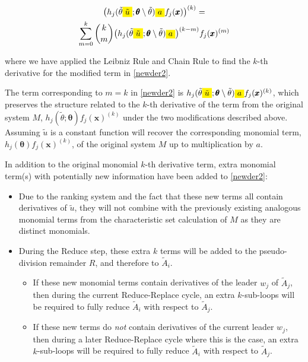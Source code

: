 \documentclass[a4paper,fleqn]{cas-dc}
\newcommand{\mathcolorbox}[2]{\colorbox{#1}{$\displaystyle #2$}}
\theoremstyle{definition}
\begin{document}
\begin{pf}
\begin{fleqn}
    \begin{multline}
        \big(h_j(\tilde{\theta} \mathcolorbox{Yellow}{\tilde{u}}; \pmb{\theta}\setminus \tilde{\theta}) \mathcolorbox{Yellow}{a} f_j(\pmb{x})\big)^{(k)} 
        = \\ \sum_{m=0}^{k} {\binom{k}{m}} \big(h_j(\tilde{\theta} \mathcolorbox{Yellow}{\tilde{u}}; \pmb{\theta}\setminus \tilde{\theta}) \mathcolorbox{Yellow}{a} \big)^{(k-m)}f_j(\pmb{x})^{(m)}  
        \label{newder2}  
    \end{multline}
    \end{fleqn}
    where we have applied the Leibniz Rule and Chain Rule to find the $k$-th derivative for the modified term in \cref{newder2}. 

    The term corresponding to $m=k$ in \cref{newder2} is $h_j(\tilde{\theta} \mathcolorbox{Yellow}{\tilde{u}}; \pmb{\theta}\setminus \tilde{\theta}) \mathcolorbox{Yellow}{a} f_j(\pmb{x})^{(k)}$, which preserves the structure related to the $k$-th derivative of the term from the original system $M$, $h_j(\tilde{\theta}; \pmb{\theta}) f_j(\pmb{x})^{(k)}$ under the two modifications described above.
    Assuming $\tilde{u}$ is a constant function will recover the corresponding monomial term, $h_j(\pmb{\theta}) f_j(\pmb{x})^{(k)}$, of the original system $M$ up to multiplication by $a$.

    In addition to the original monomial $k$-th derivative term, extra monomial term(s) with potentially new information have been added to \cref{newder2}:
    \begin{itemize}
        \item Due to the ranking system and the fact that these new terms all contain derivatives of $\tilde{u}$, they will not combine with the previously existing analogous monomial terms from the characteristic set calculation of $M$ as they are distinct monomials. 
        \item During the Reduce step, these extra $k$ terms will be added to the pseudo-division remainder $R$, and therefore to $\tilde{A}_i$.
        \begin{itemize}
            \item If these new monomial terms contain derivatives of the leader $w_j$ of $\tilde{A}_j$, then during the current Reduce-Replace cycle, an extra $k$-sub-loops will be required to fully reduce $\tilde{A}_i$ with respect to $\tilde{A}_j$.
            \item If these new terms do \textit{not} contain derivatives of the current leader $w_j$, then during a later Reduce-Replace cycle where this is the case, an extra $k$-sub-loops will be required to fully reduce $\tilde{A}_i$ with respect to $\tilde{A}_j$.
        \end{itemize}
    \end{itemize}


\end{pf}
\end{document}
